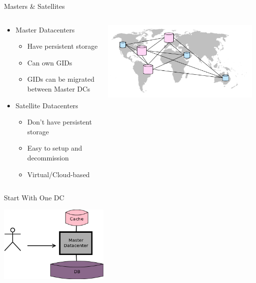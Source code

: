 \documentclass[aspectratio=169]{beamer}
\begin{document}
\begin{frame}{Masters \& Satellites}
    \begin{columns}
        \begin{column}[c]{0.6\textwidth}
            \begin{itemize}
                \item Master Datacenters
                    \begin{itemize}
                        \item Have persistent storage
                        \item Can own GIDs
                        \item GIDs can be migrated between Master DCs
                    \end{itemize}
                \item Satellite Datacenters
                    \begin{itemize}
                        \item Don't have persistent storage
                        \item Easy to setup and decommission
                        \item Virtual/Cloud-based
                    \end{itemize}
            \end{itemize}
        \end{column}
        \begin{column}[c]{0.4\textwidth}
            \includegraphics[width=\textwidth]{images/worldmapdc.png}
        \end{column}
    \end{columns}
\end{frame}

\begin{frame}{Start With One DC}
    \begin{center}
        \includegraphics[width=0.4\textwidth]{images/scalingdcs1.png}
    \end{center}
\end{frame}
\end{document}

